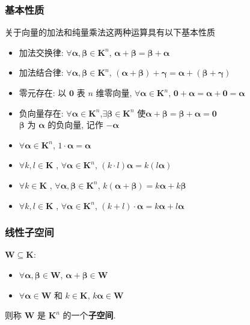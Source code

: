 \documentclass{article}
\begin{document}
			\subsubsection{基本性质}
				关于向量的加法和纯量乘法这两种运算具有以下基本性质
				\begin{itemize}
					\item 加法交换律: $\forall\boldsymbol{\alpha}, \boldsymbol{\beta} \in \mathbf{K}^{n}$, $\boldsymbol{\alpha}+\boldsymbol{\beta}=\boldsymbol{\beta}+\boldsymbol{\alpha}$
					\item 加法结合律: $\forall\boldsymbol{\alpha}, \boldsymbol{\beta} \in \mathbf{K}^{n}$, $(\boldsymbol{\alpha}+\boldsymbol{\beta})+\boldsymbol{\gamma}=\boldsymbol{\alpha}+(\boldsymbol{\beta}+\boldsymbol{\gamma})$
					\item 零元存在: 以 $\mathbf{0}$ 表 $n$ 维零向量, $\forall\boldsymbol{\alpha} \in \mathbf{K}^{n}$, $\mathbf{0}+\boldsymbol{\alpha}=\boldsymbol{\alpha}+\mathbf{0}=\boldsymbol{\alpha}$
					\item 负向量存在: $\forall\boldsymbol{\alpha} \in \mathbf{K}^{n}$,$\exists\boldsymbol{\beta} \in \mathbf{K}^{n}$ 使$\boldsymbol{\alpha}+\boldsymbol{\beta}=\boldsymbol{\beta}+\boldsymbol{\alpha}=\mathbf{0}$\\$\boldsymbol{\beta}$ 为 $\boldsymbol{\alpha}$ 的负向量, 记作 $-\boldsymbol{\alpha}$
					\item $\forall\boldsymbol\alpha \in \mathbf{K}^{n}$, $1 \cdot \boldsymbol\alpha=\boldsymbol\alpha$
					\item $\forall k, l \in \mathbf{K}$ , $\forall\boldsymbol\alpha \in \mathbf{K}^{n}$, $(k \cdot l) \boldsymbol{\alpha}=k(l \boldsymbol{\alpha})$
					\item $\forall k \in \mathbf{K}$ , $\forall\boldsymbol{\alpha}, \boldsymbol{\beta} \in \mathbf{K}^{n}$, $k(\boldsymbol{\alpha}+\boldsymbol{\beta})=k \boldsymbol{\alpha}+k \boldsymbol{\beta}$
					\item $\forall k, l \in \mathbf{K}$ , $\forall\boldsymbol\alpha \in \mathbf{K}^{n}$, $(k+l) \cdot \boldsymbol\alpha=k \boldsymbol\alpha+l \boldsymbol\alpha$
				\end{itemize}
			\subsubsection{线性子空间}
				$\boldsymbol W \subseteq \mathbf{K}$:
				\begin{itemize}
					\item $\forall\boldsymbol{\alpha}, \boldsymbol{\beta} \in \boldsymbol W$, $\boldsymbol{\alpha}+\boldsymbol{\beta} \in \boldsymbol W$
					\item $\forall\boldsymbol{\alpha} \in \boldsymbol W$ 和 $k \in \mathbf{K}$, $k \boldsymbol{\alpha} \in \boldsymbol W$
				\end{itemize}
				则称 $\boldsymbol W$ 是 $\mathbf{K}^{n}$ 的一个\textbf{子空间}.
\end{document}
